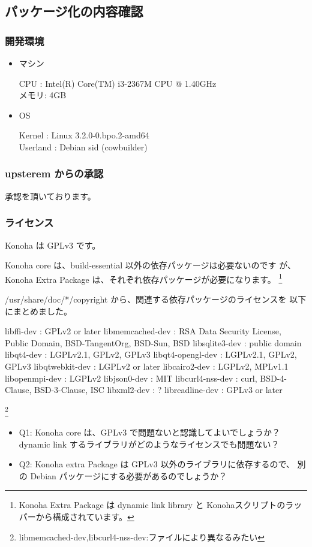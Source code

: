 \documentclass[mingoth,a4paper]{jsarticle}
\begin{document}
\subsection{パッケージ化の内容確認}
\subsubsection{開発環境}
\begin{itemize}
\item マシン

    CPU   : Intel(R) Core(TM) i3-2367M CPU @ 1.40GHz\\
    メモリ: 4GB
\item OS

    Kernel   : Linux 3.2.0-0.bpo.2-amd64\\
    Userland : Debian sid (cowbuilder)
\end{itemize}
\subsubsection{upsterem からの承認}
承認を頂いております。

\subsubsection{ライセンス}
Konoha は GPLv3 です。

Konoha core は、build-essential 以外の依存パッケージは必要ないのです
が、Konoha Extra Package は、それぞれ依存パッケージが必要になります。
\footnote{Konoha Extra Package は dynamic link library と Konohaスクリプトのラッパーから構成されています。}

/usr/share/doc/*/copyright から、関連する依存パッケージのライセンスを
以下にまとめました。

\begin{commandline}
  libffi-dev        : GPLv2 or later
  libmemcached-dev  : RSA Data Security License, Public Domain,
                     BSD-TangentOrg, BSD-Sun, BSD
  libsqlite3-dev    : public domain
  libqt4-dev        : LGPLv2.1, GPLv2, GPLv3
  libqt4-opengl-dev : LGPLv2.1, GPLv2, GPLv3
  libqtwebkit-dev   : LGPLv2 or later
  libcairo2-dev     : LGPLv2, MPLv1.1
  libopenmpi-dev    : LGPLv2
  libjson0-dev      : MIT
  libcurl4-nss-dev  : curl, BSD-4-Clause, BSD-3-Clause, ISC
  libxml2-dev       : ?
  libreadline-dev   : GPLv3 or later
\end{commandline}
\footnote{libmemcached-dev,libcurl4-nss-dev:ファイルにより異なるみたい}

\begin{itemize}
\item Q1: Konoha core は、GPLv3 で問題ないと認識してよいでしょうか？\\
dynamic link するライブラリがどのようなライセンスでも問題ない？
\item Q2: Konoha extra Package は GPLv3 以外のライブラリに依存するので、
別の Debian パッケージにする必要があるのでしょうか？
\end{itemize}
\end{document}
